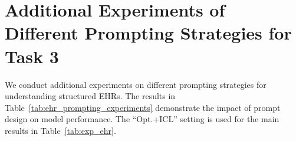 \documentclass{article}
\begin{document}
\section{Additional Experiments of Different Prompting Strategies for Task 3}
\label{sec:app_task3_llm_prompting_strategy_comparison}

We conduct additional experiments on different prompting strategies for understanding structured EHRs. The results in Table~\ref{tab:ehr_prompting_experiments} demonstrate the impact of prompt design on model performance. The ``Opt.+ICL'' setting is used for the main results in Table~\ref{tab:exp_ehr}.

\begin{table}[!ht]
\centering
\caption{\textit{Additional experiments on different prompting strategies for task 3.}}
\label{tab:ehr_prompting_experiments}
\captionsetup{justification=raggedright,singlelinecheck=false,font=tiny}
\caption*{\textit{\textbf{Note:}} \textbf{Basic}: Directly feeding EHR data values. \textbf{Optimized}: Additionally incorporating the unit and reference range of each feature for better LLM understanding. \textbf{Opt.+ICL}: Upon the optimized setting, additionally adding one in-context learning example.}
\end{table}
\end{document}
